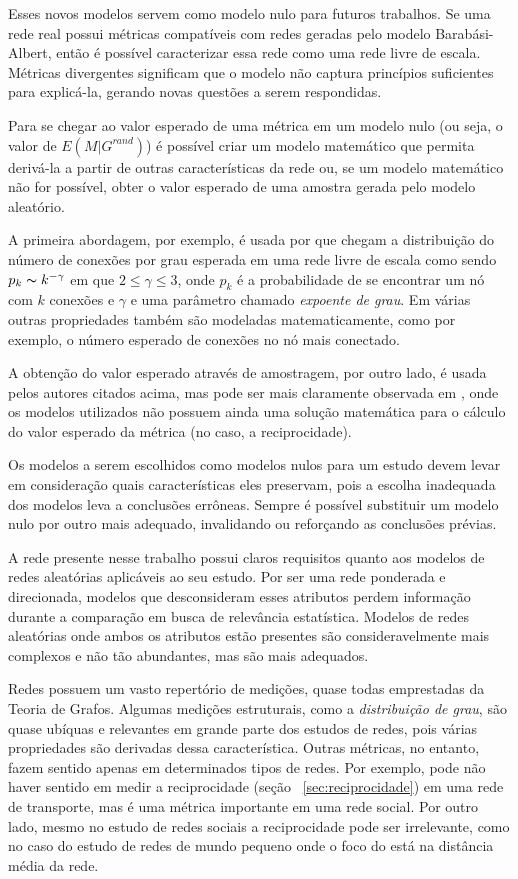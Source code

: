 \documentclass[12pt,a4paper]{article}
\theoremstyle{hypo}
\begin{document}
Esses novos modelos servem como modelo nulo para futuros trabalhos. Se uma rede real possui métricas compatíveis com redes geradas pelo modelo Barabási-Albert, então é possível caracterizar essa rede como uma rede livre de escala. Métricas divergentes significam que o modelo não captura princípios suficientes para explicá-la, gerando novas questões a serem respondidas.

Para se chegar ao valor esperado de uma métrica em um modelo nulo (ou seja, o valor de $E(M|G^\textit{rand})$) é possível criar um modelo matemático que permita derivá-la a partir de outras características da rede ou, se um modelo matemático não for possível, obter o valor esperado de uma amostra gerada pelo modelo aleatório.

A primeira abordagem, por exemplo, é usada por  que chegam a distribuição do número de conexões por grau esperada em uma rede livre de escala como sendo $p_k \thicksim k^{-\gamma}$ em que $2 \leq \gamma \leq 3$, onde $p_k$ é a probabilidade de se encontrar um nó com $k$ conexões e $\gamma$ e uma parâmetro chamado \textit{expoente de grau}. Em  várias outras propriedades também são modeladas matematicamente, como por exemplo, o número esperado de conexões no nó mais conectado.

A obtenção do valor esperado através de amostragem, por outro lado, é usada pelos autores citados acima, mas pode ser mais claramente observada em , onde os modelos utilizados não possuem ainda uma solução matemática para o cálculo do valor esperado da métrica (no caso, a reciprocidade).

Os modelos a serem escolhidos como modelos nulos para um estudo devem levar em consideração quais características eles preservam, pois a escolha inadequada dos modelos leva a conclusões errôneas. Sempre é possível substituir um modelo nulo por outro mais adequado, invalidando ou reforçando as conclusões prévias.

A rede presente nesse trabalho possui claros requisitos quanto aos modelos de redes aleatórias aplicáveis ao seu estudo. Por ser uma rede ponderada e direcionada, modelos que desconsideram esses atributos perdem informação durante a comparação em busca de relevância estatística. Modelos de redes aleatórias onde ambos os atributos estão presentes são consideravelmente mais complexos e não tão abundantes, mas são mais adequados.

Redes possuem um vasto repertório de medições, quase todas emprestadas da Teoria de Grafos. Algumas medições estruturais, como a \textit{distribuição de grau}, são quase ubíquas e relevantes em grande parte dos estudos de redes, pois várias propriedades são derivadas dessa característica. Outras métricas, no entanto, fazem sentido apenas em determinados tipos de redes. Por exemplo, pode não haver sentido em medir a reciprocidade (seção ~\ref{sec:reciprocidade}) em uma rede de transporte, mas é uma métrica importante em uma rede social. Por outro lado, mesmo no estudo de redes sociais a reciprocidade pode ser irrelevante, como no caso do estudo de redes de mundo pequeno onde o foco do está na distância média da rede.
\end{document}
